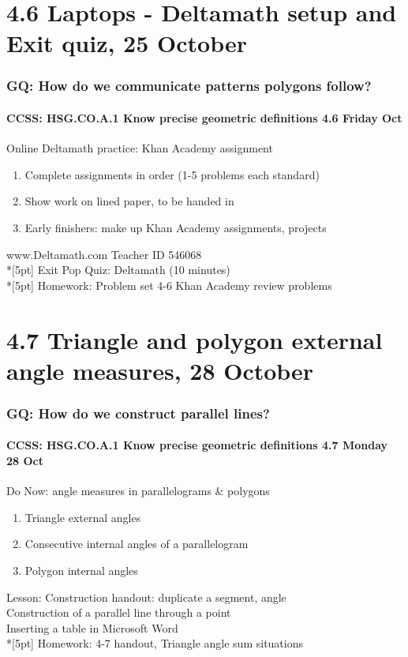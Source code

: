\documentclass{beamer}
\begin{document}
\section{4.6 Laptops - Deltamath setup and Exit quiz, 25 October}
\frame
{
  \frametitle{GQ: How do we communicate patterns polygons follow?}
  \framesubtitle{CCSS: HSG.CO.A.1 Know precise geometric definitions \hfill \alert{4.6 Friday Oct}}

  \begin{block}{Online Deltamath practice: Khan Academy assignment}
  \begin{enumerate}
    \item Complete assignments in order (1-5 problems each standard)
    \item Show work on lined paper, to be handed in
    \item Early finishers: make up Khan Academy assignments, projects
  \end{enumerate}
  \end{block}
  www.Deltamath.com Teacher ID \alert{546068}\\*[5pt]
  Exit \alert{Pop Quiz}: Deltamath (10 minutes) \\*[5pt]
  Homework: Problem set 4-6 Khan Academy review problems
}

\section{4.7 Triangle and polygon external angle measures, 28 October}
\frame
{
  \frametitle{GQ: How do we construct parallel lines?}
  \framesubtitle{CCSS: HSG.CO.A.1 Know precise geometric definitions \hfill \alert{4.7 Monday 28 Oct}}

  \begin{block}{Do Now: angle measures in parallelograms \& polygons}
  \begin{enumerate}
    \item Triangle external angles
    \item Consecutive internal angles of a parallelogram
    \item Polygon internal angles
  \end{enumerate}
  \end{block}
  Lesson: Construction handout: duplicate a segment, angle \\
  Construction of a parallel line through a point\\
  Inserting a table in Microsoft Word \\*[5pt]
  Homework: 4-7 handout, Triangle angle sum situations
}
\end{document}
